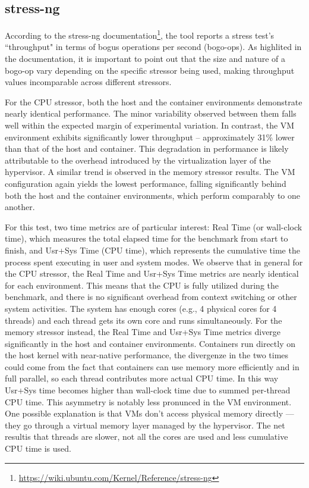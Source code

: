 \subsection{stress-ng}

According to the stress-ng documentation\footnote{\url{https://wiki.ubuntu.com/Kernel/Reference/stress-ng}}, the tool reports a stress test's ``throughput" in terms of bogus operations per second (bogo-ops). As highlited in the documentation, it is important to point out that the size and nature of a bogo-op vary depending on the specific stressor being used, making throughput values incomparable across different stressors.

For the CPU stressor, both the host and the container environments demonstrate nearly identical performance. The minor variability observed between them falls well within the expected margin of experimental variation. In contrast, the VM environment exhibits significantly lower throughput -- approximately 31\% lower than that of the host and container. This degradation in performance is likely attributable to the overhead introduced by the virtualization layer of the hypervisor. A similar trend is observed in the memory stressor results. The VM configuration again yields the lowest performance, falling significantly behind both the host and the container environments, which perform comparably to one another.

For this test, two time metrics are of particular interest: Real Time (or wall-clock time), which measures the total elapsed time for the benchmark from start to finish, and Usr+Sys Time (CPU time), which represents the cumulative time the process spent executing in user and system modes. We observe that in general for the CPU stressor, the Real Time and Usr+Sys Time metrics are nearly identical for each environment. This means that the CPU is fully utilized during the benchmark, and there is no significant overhead from context switching or other system activities. The system has enough cores (e.g., 4 physical cores for 4 threads) and each thread gets its own core and runs simultaneously. For the memory stressor instead, the Real Time and Usr+Sys Time metrics diverge significantly in the host and container environments. Containers run directly on the host kernel with near-native performance, the divergenze in the two times could come from the fact that containers can use memory more efficiently and in full parallel, so each thread contributes more actual CPU time. In this way Usr+Sys time becomes higher than wall-clock time due to summed per-thread CPU time. This asymmetry is notably less pronunced in the VM environment. One possible explanation is that VMs don't access physical memory directly — they go through a virtual memory layer managed by the hypervisor. The net resultis that threads are slower, not all the cores are used and less cumulative CPU time is used.

